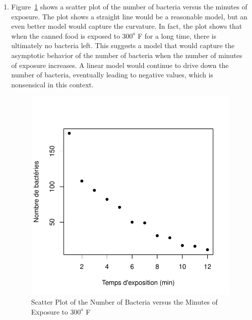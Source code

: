 \begin{solution}{2.22}
\begin{enumerate}
\item Figure~\ref{fig:simple:bact1} shows a scatter plot of the number of bacteria versus the minutes of exposure. The plot shows a straight line would be a reasonable model, but an even better model would capture the curvature. In fact, the plot shows that when the canned food is exposed to $300^{o}$ F for a long time, there is ultimately no bacteria left. This suggests a model that would capture the asymptotic behavior of the number of bacteria when the number of minutes of exposure increases. A linear model would continue to drive down the number of bacteria, eventually leading to negative values, which is nonsensical in this context.

\begin{figure}
\begin{knitrout}
\color{fgcolor}

{\centering \includegraphics[width=.45\linewidth]{figure/fig-simple-bact1-1}

}



\end{knitrout}
\caption{Scatter Plot of the Number of Bacteria versus the Minutes of Exposure to $300^{o}$ F}
\label{fig:simple:bact1}
\end{figure}


\end{enumerate}
\end{solution}
